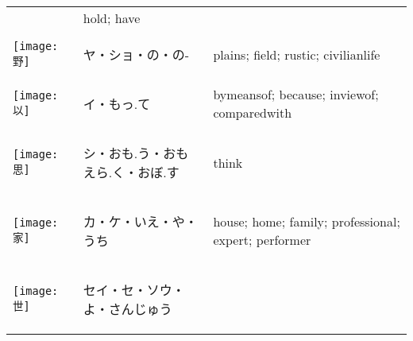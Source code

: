 \documentclass[a4paper,12pt]{extarticle}
\begin{document}
\begin{longtable}{|lp{6cm}p{4cm}|}
&
hold; have
\\ 
\begin{minipage}{0.3\textwidth}
\centerline{
	\texttt{[image: 野]}
}
\end{minipage}
&
\begin{CJK}{UTF8}{min}ヤ・ショ・の・の-\end{CJK}
&
plains; field; rustic; civilianlife
\\ 
\begin{minipage}{0.3\textwidth}
\centerline{
	\texttt{[image: 以]}
}
\end{minipage}
&
\begin{CJK}{UTF8}{min}イ・もっ.て\end{CJK}
&
bymeansof; because; inviewof; comparedwith
\\ 
\begin{minipage}{0.3\textwidth}
\centerline{
	\texttt{[image: 思]}
}
\end{minipage}
&
\begin{CJK}{UTF8}{min}シ・おも.う・おもえら.く・おぼ.す\end{CJK}
&
think
\\ 
\begin{minipage}{0.3\textwidth}
\centerline{
	\texttt{[image: 家]}
}
\end{minipage}
&
\begin{CJK}{UTF8}{min}カ・ケ・いえ・や・うち\end{CJK}
&
house; home; family; professional; expert; performer
\\ 
\begin{minipage}{0.3\textwidth}
\centerline{
	\texttt{[image: 世]}
}
\end{minipage}
&
\begin{CJK}{UTF8}{min}セイ・セ・ソウ・よ・さんじゅう\end{CJK}

\end{longtable}
\end{document}
